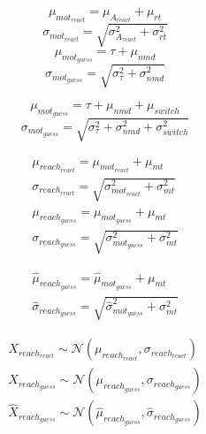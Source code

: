 \documentclass[12pt,letterpaper]{article}
\begin{document}
\begin{equation}
    \mu_{mot_{react}} = \mu_{A_{react}} + \mu_{rt}
\end{equation}
\begin{equation}
    \sigma_{mot_{react}} = \sqrt{\sigma_{A_{react}}^2 + \sigma_{rt}^2}
\end{equation}
\begin{equation}
    \mu_{mot_{guess}} = \tau +  \mu_{nmd}
\end{equation}
\begin{equation}
    \sigma_{mot_{guess}} = \sqrt{\sigma_{\tau}^2 + \sigma_{nmd}^2}
\end{equation}

\begin{equation}
    \mu_{mot_{guess}} = \tau +  \mu_{nmd} + \mu_{switch}
\end{equation}
\begin{equation}
    \sigma_{mot_{guess}} = \sqrt{\sigma_{\tau}^2 + \sigma_{nmd}^2 + \sigma_{switch}^2}
\end{equation}

\begin{align}
    \mu_{reach_{react}} =\mu_{mot_{react}} + \mu_{mt}                      \\
    \sigma_{reach_{react}} = \sqrt{\sigma_{mot_{react}}^2 + \sigma_{mt}^2} \\
    \mu_{reach_{guess}} =\mu_{mot_{guess}} + \mu_{mt}                      \\
    \sigma_{reach_{guess}} = \sqrt{\sigma_{mot_{guess}}^2 + \sigma_{mt}^2}
\end{align}

\begin{align}
    \hat{\mu}_{reach_{guess}} = \hat{\mu}_{mot_{guess}} + \mu_{mt} \\
    \hat{\sigma}_{reach_{guess}} = \sqrt{\hat{\sigma}_{mot_{guess}}^2 + \sigma_{mt}^2}
\end{align}


\begin{align}
    X_{reach_{react}} \sim \mathcal{N}(\mu_{reach_{react}}, \sigma_{reach_{react}}) \\
    X_{reach_{guess}} \sim \mathcal{N}(\mu_{reach_{guess}}, \sigma_{reach_{guess}}) \\
    \hat{X}_{reach_{guess}} \sim \mathcal{N}(\hat{\mu}_{reach_{guess}}, \hat{\sigma}_{reach_{guess}})
\end{align}
\end{document}
